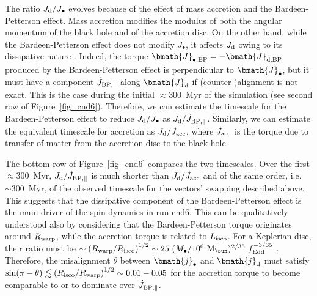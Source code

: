 \documentclass[a4paper,fleqn,usenatbib]{mnras}
\begin{document}
The ratio $J_{\rm d}/J_{\bullet}$ evolves because of the effect of mass accretion and the Bardeen-Petterson effect. 
Mass accretion modifies the modulus of both the angular momentum of the black hole and of the accretion disc.
On the other hand, while the Bardeen-Petterson effect does not modify $J_{\bullet}$, it affects $J_{\rm d}$ owing to its dissipative nature \citep{king+05}.
Indeed, the torque $\dot{\bmath{J}}_{\bullet, \rm BP} = - \dot{\bmath{J}}_{\rm d, BP}$ produced by the Bardeen-Petterson effect is perpendicular to $\bmath{J}_{\bullet}$, but it must have a component $\dot{J}_{\rm BP, \parallel}$ along $\bmath{J}_{\rm d}$ if (counter-)alignment is not exact.
This is the case during the initial $\approx 300$~Myr of the simulation (see second row of Figure~\ref{fig_cnd6}).
Therefore, we can estimate the timescale for the Bardeen-Petterson effect to reduce $J_{\rm d}/J_{\bullet}$ as $J_{\rm d} / \dot{J}_{\rm BP, \parallel}$. 
Similarly, we can estimate the equivalent timescale for accretion as $J_{\rm d} / \dot{J}_{\rm acc}$, where $\dot{J}_{\rm acc}$ is the torque due to transfer of matter from the accretion disc to the black hole. 

The bottom row of Figure~\ref{fig_cnd6} compares the two timescales.
Over the first $\approx 300$~Myr, $J_{\rm d} / \dot{J}_{\rm BP, \parallel}$ is much shorter than $J_{\rm d} / \dot{J}_{\rm acc}$ and of the same order, i.e. $\sim 300$~Myr, of the observed timescale for the vectors' swapping described above.
This suggests that the dissipative component of the Bardeen-Petterson effect is the main driver of the spin dynamics in run cnd6.
This can be qualitatively understood also by considering that the Bardeen-Petterson torque originates around $R_{\rm warp}$, while the accretion torque is related to $L_{\rm isco}$.
For a Keplerian disc, their ratio must be $\sim \left( R_{\rm warp} / R_{\rm isco} \right)^{1/2} \sim 25~(M_{\bullet}/10^6~{\rm M}_{\sun})^{2/35}~f_{\rm Edd}^{-3/35}$ \citep{lodato+06, martin+07, perego+09}.
Therefore, the misalignment $\theta$ between $\bmath{j}_{\bullet}$ and $\bmath{j}_{\rm d}$ must satisfy $\sin(\pi - \theta) \lesssim \left( R_{\rm isco} / R_{\rm warp} \right)^{1/2} \sim 0.01-0.05$ for the accretion torque to become comparable to or to dominate over $\dot{J}_{\rm BP,\parallel}$.
\end{document}
